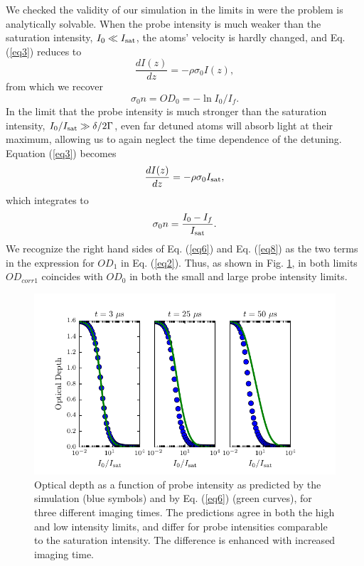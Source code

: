 \documentclass[12pt]{iopart}
\begin{document}
\par We checked the validity of our simulation in the limits in were the problem is analytically solvable. When the probe intensity is much weaker than the saturation intensity, $I_0\ll I_{\rm{sat}}$, the atoms' velocity is hardly changed, and Eq.(\ref{eq3}) reduces to 
\begin{equation}
\frac{dI(z)}{dz}=-\rho\sigma_0 I(z),
\end{equation}
from which we recover 
\begin{equation}
\sigma_0 n = OD_0 = -\ln I_0/I_f. \label{eq6}
\end{equation}
In the limit that the probe intensity is much stronger than the saturation intensity, $I_0/I_{\rm{sat}}\gg \delta/2\Gamma$, even far detuned atoms will absorb light at their maximum, allowing us to again neglect the time dependence of the detuning. Equation (\ref{eq3}) becomes 
\begin{equation}
\frac{dI(z)}{dz}=-\rho\sigma_0 I_{\rm{sat}}, 
\end{equation}
which integrates to 
\begin{equation}
\sigma_0 n = \frac{I_0 - I_f}{I_{\rm{sat}}}. \label{eq8}
\end{equation}
We recognize the right hand sides of Eq. (\ref{eq6}) and Eq. (\ref{eq8}) as the two terms in the expression for $OD_1$ in Eq. (\ref{eq2}). Thus, as shown in  Fig. \ref{fig:IsatLimits}, in both limits $OD_{corr1}$  coincides with $OD_0$ in both the small and large probe intensity limits. 
\begin{figure}
	\includegraphics{figure3.pdf}
\caption{Optical depth as a function of probe intensity as predicted by the simulation (blue symbols) and by Eq. (\ref{eq6}) (green curves), for three different imaging times. The predictions agree in both the high and low intensity limits, and differ for probe intensities comparable to the saturation intensity. The difference is enhanced with increased imaging time.}  
\label{fig:IsatLimits}
\end{figure}
\end{document}
